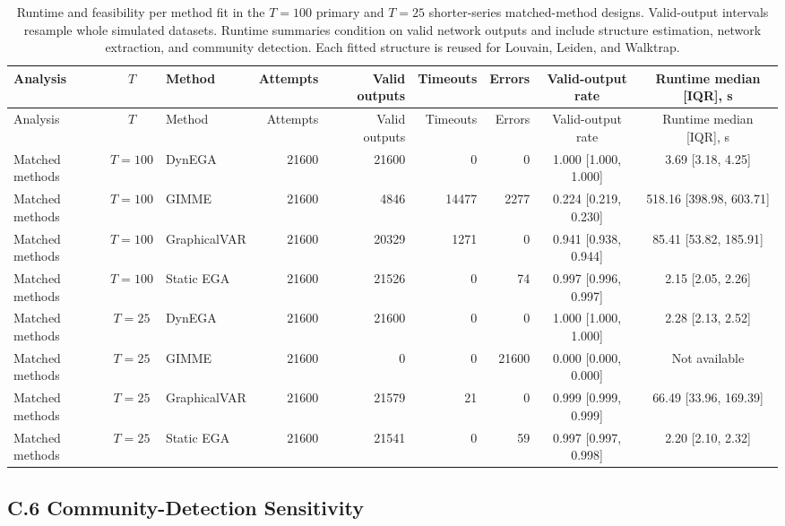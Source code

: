 \documentclass[
]{article}
\begin{document}
\begin{landscape}\footnotesize\setlength{\tabcolsep}{3pt}

\begin{longtable}[t]{lclrrrrcc}
\caption{Runtime and feasibility per method fit in the $T=100$ primary and $T=25$ shorter-series matched-method designs. Valid-output intervals resample whole simulated datasets. Runtime summaries condition on valid network outputs and include structure estimation, network extraction, and community detection. Each fitted structure is reused for Louvain, Leiden, and Walktrap.}\\
\toprule
Analysis & $T$ & Method & Attempts & Valid outputs & Timeouts & Errors & Valid-output rate & Runtime median [IQR], s\\
\midrule
\endfirsthead
\toprule
Analysis & $T$ & Method & Attempts & Valid outputs & Timeouts & Errors & Valid-output rate & Runtime median [IQR], s\\
\midrule
\endhead
Matched methods & $T=100$ & DynEGA & 21600 & 21600 & 0 & 0 & 1.000 [1.000, 1.000] & 3.69 [3.18, 4.25]\\
Matched methods & $T=100$ & GIMME & 21600 & 4846 & 14477 & 2277 & 0.224 [0.219, 0.230] & 518.16 [398.98, 603.71]\\
Matched methods & $T=100$ & GraphicalVAR & 21600 & 20329 & 1271 & 0 & 0.941 [0.938, 0.944] & 85.41 [53.82, 185.91]\\
Matched methods & $T=100$ & Static EGA & 21600 & 21526 & 0 & 74 & 0.997 [0.996, 0.997] & 2.15 [2.05, 2.26]\\
Matched methods & $T=25$ & DynEGA & 21600 & 21600 & 0 & 0 & 1.000 [1.000, 1.000] & 2.28 [2.13, 2.52]\\
\addlinespace
Matched methods & $T=25$ & GIMME & 21600 & 0 & 0 & 21600 & 0.000 [0.000, 0.000] & Not available\\
Matched methods & $T=25$ & GraphicalVAR & 21600 & 21579 & 21 & 0 & 0.999 [0.999, 0.999] & 66.49 [33.96, 169.39]\\
Matched methods & $T=25$ & Static EGA & 21600 & 21541 & 0 & 59 & 0.997 [0.997, 0.998] & 2.20 [2.10, 2.32]\\
\bottomrule
\end{longtable}
\end{landscape}

\newpage

\subsection{C.6 Community-Detection
Sensitivity}\label{c.6-community-detection-sensitivity}
\end{document}
